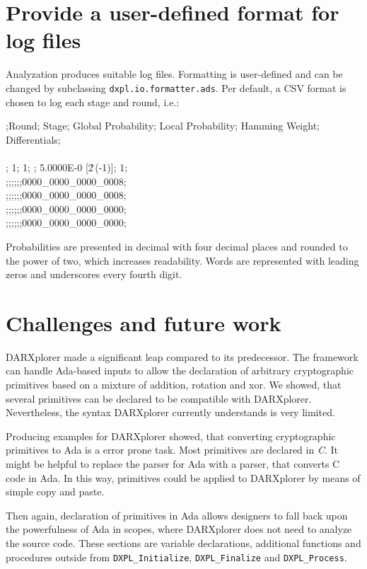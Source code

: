 \documentclass{acmtrans2m}
\begin{document}
\section{Provide a user-defined format for log files}\label{chapter:log}

Analyzation produces suitable log files. Formatting is user-defined
and can be changed by subclassing \texttt{dxpl.io.formatter.ads}.
Per default, a CSV format is chosen to log each stage and round, i.e.:

\begin{tabbing}
;Round; Stage; Global Probability; Local Probability; Hamming Weight; Differentials;\\
\\
; 1; 1;     ;           5.0000E-0  [2\^\,(-1)]; 1; \\
;;;;;;0000\_0000\_0000\_0008; \\
;;;;;;0000\_0000\_0000\_0008; \\
;;;;;;0000\_0000\_0000\_0000; \\
;;;;;;0000\_0000\_0000\_0000; \\
\end{tabbing}

Probabilities are presented in decimal with four decimal places and
rounded to the power of two, which increases readability. Words are
represented with leading zeros and underscores every fourth digit.

\section{Challenges and future work}\label{chapter:future}

DARXplorer made a significant leap compared to its predecessor. The framework
can handle Ada-based inputs to allow the declaration of arbitrary cryptographic
primitives based on a mixture of addition, rotation and xor. We showed, that several
primitives can be declared to be compatible with DARXplorer. Nevertheless,
the syntax DARXplorer currently understands is very limited. 

Producing examples for DARXplorer showed, that converting cryptographic
primitives to Ada is a error prone task. Most primitives are declared in \textit{C}. It 
might be helpful to replace the parser for Ada with a parser, 
that converts C code in Ada. In this way, primitives could be applied to DARXplorer
by means of simple copy and paste.

Then again, declaration of primitives in Ada allows designers to fall back upon
the powerfulness of Ada in scopes, where DARXplorer does not need to analyze the 
source code. These sections are variable declarations, additional functions and
procedures outside from \texttt{DXPL\_Initialize}, \texttt{DXPL\_Finalize} and
\texttt{DXPL\_Process}.
\end{document}
